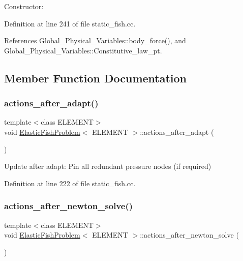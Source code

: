 Constructor\+: 



Definition at line 241 of file static\+\_\+fish.\+cc.



References Global\+\_\+\+Physical\+\_\+\+Variables\+::body\+\_\+force(), and Global\+\_\+\+Physical\+\_\+\+Variables\+::\+Constitutive\+\_\+law\+\_\+pt.



\subsection{Member Function Documentation}
\mbox{\label{classElasticFishProblem_ae54b974caafe717309ce7abc5e7f824d}} 
\subsubsection{\texorpdfstring{actions\+\_\+after\+\_\+adapt()}{actions\_after\_adapt()}}
{\footnotesize\ttfamily template$<$class E\+L\+E\+M\+E\+NT$>$ \\
void \hyperlink{classElasticFishProblem}{Elastic\+Fish\+Problem}$<$ E\+L\+E\+M\+E\+NT $>$\+::actions\+\_\+after\+\_\+adapt (\begin{DoxyParamCaption}{ }\end{DoxyParamCaption})\hspace{0.3cm}{\ttfamily [inline]}}



Update after adapt\+: Pin all redundant pressure nodes (if required) 



Definition at line 222 of file static\+\_\+fish.\+cc.

\mbox{\label{classElasticFishProblem_a41badf8aa60bf52d888338039168fcb3}} 
\subsubsection{\texorpdfstring{actions\+\_\+after\+\_\+newton\+\_\+solve()}{actions\_after\_newton\_solve()}}
{\footnotesize\ttfamily template$<$class E\+L\+E\+M\+E\+NT$>$ \\
void \hyperlink{classElasticFishProblem}{Elastic\+Fish\+Problem}$<$ E\+L\+E\+M\+E\+NT $>$\+::actions\+\_\+after\+\_\+newton\+\_\+solve (\begin{DoxyParamCaption}{ }\end{DoxyParamCaption})\hspace{0.3cm}{\ttfamily [inline]}}



